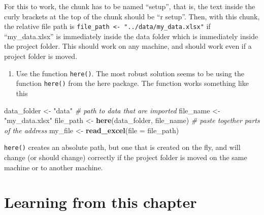 \documentclass[]{book}
\newenvironment{Shaded}{\begin{snugshade}}{\end{snugshade}}
\newcommand{\CommentTok}[1]{\textcolor[rgb]{0.56,0.35,0.01}{\textit{#1}}}
\newcommand{\DataTypeTok}[1]{\textcolor[rgb]{0.13,0.29,0.53}{#1}}
\newcommand{\KeywordTok}[1]{\textcolor[rgb]{0.13,0.29,0.53}{\textbf{#1}}}
\newcommand{\NormalTok}[1]{#1}
\newcommand{\OperatorTok}[1]{\textcolor[rgb]{0.81,0.36,0.00}{\textbf{#1}}}
\newcommand{\StringTok}[1]{\textcolor[rgb]{0.31,0.60,0.02}{#1}}
\providecommand{\tightlist}{%
  \setlength{\itemsep}{0pt}\setlength{\parskip}{0pt}}
\begin{document}
\begin{Shaded}
\end{Shaded}

For this to work, the chunk has to be named ``setup'', that is, the text inside the curly brackets at the top of the chunk should be ``r setup''. Then, with this chunk, the relative file path is \texttt{file\_path\ \textless{}-\ "../data/my\_data.xlsx"} if ``my\_data.xlsx'' is immediately inside the data folder which is immediately inside the project folder. This should work on any machine, and should work even if a project folder is moved.

\begin{enumerate}
\def\labelenumi{\arabic{enumi}.}
\setcounter{enumi}{2}
\tightlist
\item
  Use the function \texttt{here()}. The most robust solution seems to be using the function \texttt{here()} from the here package. The function works something like this
\end{enumerate}

\begin{Shaded}
\begin{Highlighting}[]
\NormalTok{data_folder <-}\StringTok{ "data"} \CommentTok{# path to data that are imported}
\NormalTok{file_name <-}\StringTok{ "my_data.xlsx"}
\NormalTok{file_path <-}\StringTok{ }\KeywordTok{here}\NormalTok{(data_folder, file_name) }\CommentTok{# paste together parts of the address}
\NormalTok{my_file <-}\StringTok{ }\KeywordTok{read_excel}\NormalTok{(}\DataTypeTok{file =}\NormalTok{ file_path)}
\end{Highlighting}
\end{Shaded}

\texttt{here()} creates an absolute path, but one that is created on the fly, and will change (or should change) correctly if the project folder is moved on the same machine or to another machine.

\hypertarget{learning-from-this-chapter}{%
\section{Learning from this chapter}\label{learning-from-this-chapter}}
\end{document}
